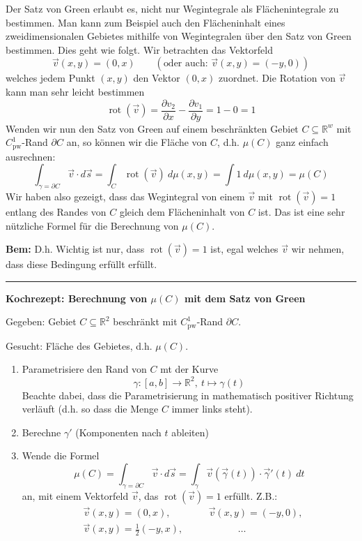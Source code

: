 \documentclass[a4paper,landscape,8pt]{extarticle}
\newcommand{\R}{\mathbb{R}}
\newcommand{\sep}{\vspace{5pt}\noindent\hrule\vspace{5pt}}
\newcommand{\Bem}{\textbf{Bem: }}
\DeclareMathOperator{\rot}{rot}
\begin{document}
\begin{multicols*}{4}
Der Satz von Green erlaubt es, nicht nur Wegintegrale als Flächenintegrale zu
bestimmen. Man kann zum Beispiel auch den Flächeninhalt eines zweidimensionalen
Gebietes mithilfe von Wegintegralen über den Satz von Green bestimmen. Dies geht
wie folgt. Wir betrachten das Vektorfeld
\[
\vec{v}(x,y) = (0,x) \qquad \left(\text{oder auch: } \vec{v}(x,y) = (-y,0)
\right)
\]
welches jedem Punkt $(x,y)$ den Vektor $(0,x)$ zuordnet. Die Rotation von
$\vec{v}$ kann man sehr leicht bestimmen
\[
\rot(\vec{v}) 
= \frac{\partial v_2}{\partial x} - \frac{\partial v_1}{\partial y}
= 1 - 0 = 1
\]
Wenden wir nun den Satz von Green auf einem beschränkten Gebiet $C\subseteq\R^w$
mit $C^1_{\text{pw}}$-Rand $\partial C$ an, so können wir die Fläche von $C$,
d.h. $\mu(C)$ ganz einfach ausrechnen:
\[
\int_{\gamma=\partial C}\vec{v}\cdot d\vec{s}
=\int_C \rot(\vec{v}) \ d\mu(x,y)
=\int 1 \ d\mu(x,y)
=\mu(C)
\]
Wir haben also gezeigt, dass das Wegintegral von einem $\vec{v}$ mit
$\rot(\vec{v})=1$ entlang des Randes von $C$ gleich dem Flächeninhalt von $C$
ist. Das ist eine sehr nützliche Formel für die Berechnung von $\mu(C)$.

\Bem D.h. Wichtig ist nur, dass $\rot(\vec{v})=1$ ist, egal welches $\vec{v}$
wir nehmen, dass diese Bedingung erfüllt erfüllt.
 
\sep

\textbf{Kochrezept: Berechnung von $\mu(C)$ mit dem Satz von Green} 

Gegeben: Gebiet $C\subseteq \R^2$ beschränkt mit $C^1_{\text{pw}}$-Rand
$\partial C$.
 
Gesucht: Fläche des Gebietes, d.h. $\mu(C)$.

\begin{enumerate}[label=\arabic*)]
  \item Parametrisiere den Rand von $C$ mt der Kurve
  \[
  \gamma \colon [a,b] \to \R^2, \ t \mapsto \gamma(t)
  \]
  Beachte dabei, dass die Parametrisierung in mathematisch positiver Richtung
  verläuft (d.h. so dass die Menge $C$ immer links steht).
  \item Berechne $\gamma'$ (Komponenten nach $t$ ableiten)
  \item Wende die Formel
  \[
  \mu(C) = \int_{\gamma = \partial C} \vec{v} \cdot d\vec{s}
  =\int_\gamma \vec{v}(\vec{\gamma}(t))\cdot\vec{\gamma}'(t) \ dt
  \]
  an, mit einem Vektorfeld $\vec{v}$, das $\rot(\vec{v})=1$ erfüllt. Z.B.:
  \begin{align*}
  &\vec{v}(x,y)=(0,x), \quad &&\vec{v}(x,y)=(-y,0),\\
  &\vec{v}(x,y)=\frac{1}{2}(-y,x),\quad &&\qquad\quad\ldots
  \end{align*}
\end{enumerate}


\end{multicols*}
\end{document}

